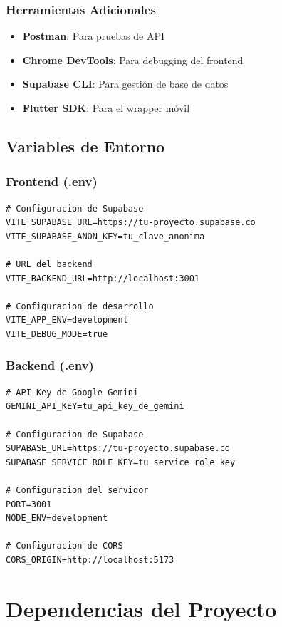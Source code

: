 \documentclass[12pt,a4paper]{report}
\begin{document}
\subsubsection{Herramientas Adicionales}
\begin{itemize}
    \item \textbf{Postman}: Para pruebas de API
    \item \textbf{Chrome DevTools}: Para debugging del frontend
    \item \textbf{Supabase CLI}: Para gestión de base de datos
    \item \textbf{Flutter SDK}: Para el wrapper móvil
\end{itemize}

\subsection{Variables de Entorno}

\subsubsection{Frontend (.env)}
\begin{lstlisting}
# Configuracion de Supabase
VITE_SUPABASE_URL=https://tu-proyecto.supabase.co
VITE_SUPABASE_ANON_KEY=tu_clave_anonima

# URL del backend
VITE_BACKEND_URL=http://localhost:3001

# Configuracion de desarrollo
VITE_APP_ENV=development
VITE_DEBUG_MODE=true
\end{lstlisting}

\subsubsection{Backend (.env)}
\begin{lstlisting}
# API Key de Google Gemini
GEMINI_API_KEY=tu_api_key_de_gemini

# Configuracion de Supabase
SUPABASE_URL=https://tu-proyecto.supabase.co
SUPABASE_SERVICE_ROLE_KEY=tu_service_role_key

# Configuracion del servidor
PORT=3001
NODE_ENV=development

# Configuracion de CORS
CORS_ORIGIN=http://localhost:5173
\end{lstlisting}

\section{Dependencias del Proyecto}
\end{document}
